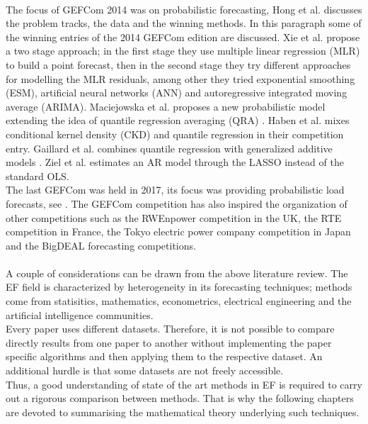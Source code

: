 \\
The focus of GEFCom 2014 was on probabilistic forecasting, Hong et al. \cite{hong2016probabilistic} discusses the problem tracks, the data and the winning methods.
In this paragraph some of the winning entries of the 2014 GEFCom edition are discussed.
Xie et al. \cite{xie2016gefcom2014} propose a two stage approach; in the first stage they use multiple linear regression (MLR) to build a point forecast, then in the second stage they try different approaches for modelling the MLR residuals, among other they tried exponential smoothing (ESM), artificial neural networks (ANN) and autoregressive integrated moving average (ARIMA). 
Maciejowska et al. \cite{maciejowska2016hybrid} proposes a new probabilistic model extending the idea of quantile regression averaging (QRA) \cite{nowotarski2015computing}.
Haben et al. \cite{haben2016hybrid} mixes conditional kernel density (CKD) and quantile regression in their competition entry.
Gaillard et al. \cite{gaillard2016additive,gaillardasemi} combines quantile regression with generalized additive models \cite{hastie2017generalized}.
Ziel et al. \cite{ziel2016lasso} estimates an AR model through the LASSO \cite{tibshirani1996regression} instead of the standard OLS.
\\
The last GEFCom was held in 2017, its focus was providing probabilistic load forecasts, see \cite{hong2019global}. The GEFCom competition has also inspired the organization of other competitions such as the RWEnpower competition in the UK, the RTE competition in France, the Tokyo electric power company competition in Japan and the BigDEAL forecasting competitions.
\\
\\
A couple of considerations can be drawn from the above literature review.
The EF field is characterized by heterogeneity in its forecasting techniques; methods come from statisitics, mathematics, econometrics, electrical engineering and the artificial intelligence communities.
\\
Every paper uses different datasets.
Therefore, it is not possible to compare directly results from one paper to another without implementing the paper specific algorithms and then applying them to the respective dataset. An additional hurdle is that some datasets are not freely accessible.
\\
Thus, a good understanding of state of the art methods in EF is required to carry out a rigorous comparison between methods.
That is why the following chapters are devoted to summarising the mathematical theory underlying such techniques.

